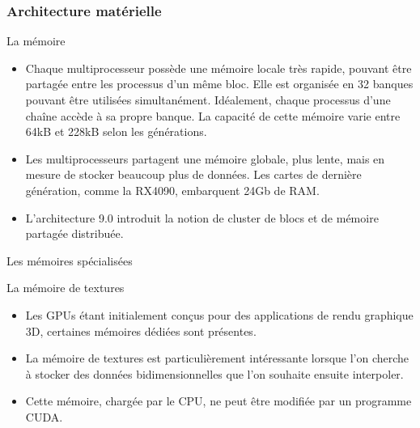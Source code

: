 \begin{frame}
    \frametitle{Architecture matérielle}
\begin{block}{La mémoire}
   \begin{itemize}
    \item<+-> Chaque multiprocesseur possède une mémoire locale très rapide, pouvant être partagée entre les processus
    d'un même bloc. Elle est organisée en 32 banques pouvant être utilisées simultanément. Idéalement, 
    chaque processus d'une chaîne accède à sa propre banque. La capacité de cette mémoire varie entre 64kB et 228kB 
    selon les générations.
    \item<+-> Les multiprocesseurs partagent une mémoire globale, plus lente, mais en mesure de stocker beaucoup plus 
    de données. Les cartes de dernière génération, comme la RX4090, embarquent 24Gb de RAM.
    \item<+-> L'architecture 9.0 introduit la notion de cluster de blocs et de mémoire partagée distribuée.
   \end{itemize} 
\end{block}
\end{frame}
\begin{frame}{Les mémoires spécialisées}
\begin{block}{La mémoire de textures}
   \begin{itemize}
    \item<+-> Les GPUs étant initialement conçus pour des applications de rendu graphique 3D, certaines mémoires
    dédiées sont présentes. 
    \item<+-> La mémoire de textures est particulièrement intéressante lorsque l'on cherche à stocker des données
    bidimensionnelles que l'on souhaite ensuite interpoler.
    \item<+-> Cette mémoire, chargée par le CPU, ne peut être modifiée par un programme CUDA.
   \end{itemize} 
\end{block}
\end{frame}
